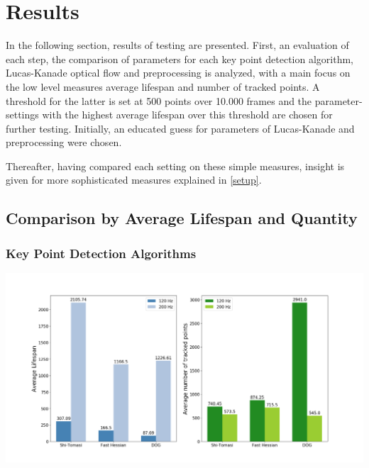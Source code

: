 \documentclass[Bachelorarbeit.tex]{subfiles}
\begin{document}
\newpage
\section{Results}
\label{Results}
In the following section, results of testing are presented. First, an evaluation of each step, the comparison of parameters for each key point detection algorithm, Lucas-Kanade optical flow and preprocessing is analyzed, with a main focus on the low level measures average lifespan and number of tracked points. A threshold for the latter is set at 500 points over 10.000 frames and the parameter-settings with the highest average lifespan over this threshold are chosen for further testing. Initially, an educated guess for parameters of Lucas-Kanade and preprocessing were chosen. 

Thereafter, having compared each setting on these simple measures, insight is given for more sophisticated measures explained in \autoref{setup}.

\subsection{Comparison by Average Lifespan and Quantity}

\subsubsection{Key Point Detection Algorithms}

\begin{center}
	\includegraphics[width=1.1\linewidth]{Images/values_keypointdetectors}
	\label{detectors_120_200}
\end{center}
\end{document}
